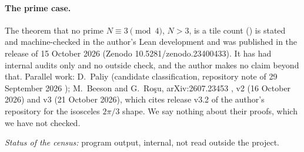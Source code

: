 \documentclass[11pt,reqno]{amsart}
\theoremstyle{plain}
\theoremstyle{definition}
\begin{document}
\paragraph{The prime case.} The theorem that no prime $N\equiv3\pmod 4$, $N>3$, is a tile count () is stated and machine-checked in the author's Lean development and was published in the release of 15 October 2026 (Zenodo 10.5281/zenodo.23400433). It has had internal audits only and no outside check, and the author makes no claim beyond that. Parallel work: D.~Paliy (candidate classification, repository note of 29 September 2026 \cite{PaliyPrime}); M.~Beeson and G.~Ro\c{s}u, arXiv:2607.23453 \cite{BeesonRosuArXiv}, v2 (16 October 2026) and v3 (21 October 2026), which cites release v3.2 of the author's repository for the isosceles $2\pi/3$ shape. We say nothing about their proofs, which we have not checked.

\emph{Status of the census:} program output, internal, not read outside the project.

\end{document}
